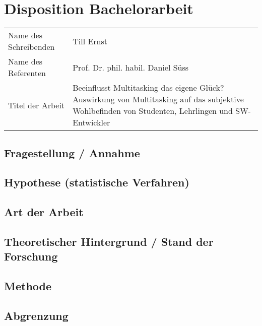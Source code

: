 %
%
\chapter*{Disposition Bachelorarbeit}\label{chap.dispo}
\glsresetall
\begin{tabularx}{17cm}{lX}
Name des Schreibenden & Till Ernst \\
Name des Referenten & Prof. Dr. phil. habil. Daniel Süss \\
Titel der Arbeit & Beeinflusst Multitasking das eigene Glück? Auswirkung von Multitasking auf das subjektive Wohlbefinden von Studenten, Lehrlingen und SW-Entwickler\\
\end{tabularx}
\section*{Fragestellung / Annahme}\label{section.fragestellung}
\section*{Hypothese (statistische Verfahren)}\label{section.hypothesen}
\section*{Art der Arbeit}\label{section.artArbeit}
\section*{Theoretischer Hintergrund / Stand der Forschung}\label{section.forschung}
\section*{Methode}\label{section.methode}
\section*{Abgrenzung}\label{section.abgrenzung}
